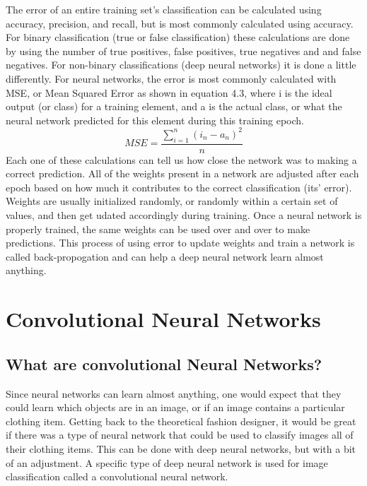 \documentclass[12pt]{report} %
\begin{document}
	The error of an entire training set's classification can be calculated using accuracy, precision, and recall, but is most commonly calculated using accuracy.  For binary classification (true or false classification) these calculations are done by using the number of true positives, false positives, true negatives and and false negatives. For non-binary classifications (deep neural networks) it is done a little differently. For neural networks, the error is most commonly calculated with MSE, or Mean Squared Error as shown in equation 4.3, where i is the ideal output (or class) for a training element, and a is the actual class, or what the neural network predicted for this element during this training epoch\cite{errorHeaton}.
\begin{equation}
MSE = \frac{\sum\limits_{i=1}^n (i_{n} - a_{n})^2}{n}
\end{equation}		
	Each one of these calculations can tell us how close the network was to making a correct prediction. All of the weights present in a network are adjusted after each epoch based on how much it contributes to the correct classification (its' error). Weights are usually initialized randomly, or randomly within a certain set of values, and then get udated accordingly during training\cite{errorHeaton}. Once a neural network is properly trained, the same weights can be used over and over to make predictions. This process of using error to update weights and train a network is called back-propogation and can help a deep neural network learn almost anything.\cite{KubatMachineLearn} 
	
\chapter{Convolutional Neural Networks}
\section{What are convolutional Neural Networks?}
	Since neural networks can learn almost anything, one would expect that they could learn which objects are in an image, or if an image contains a particular clothing item. Getting back to the theoretical fashion designer, it would be great if there was a type of neural network that could be used to classify images all of their clothing items. This can be done with deep neural networks, but with a bit of an adjustment. A specific type of deep neural network is used for image classification called a convolutional neural network. 
\end{document}
